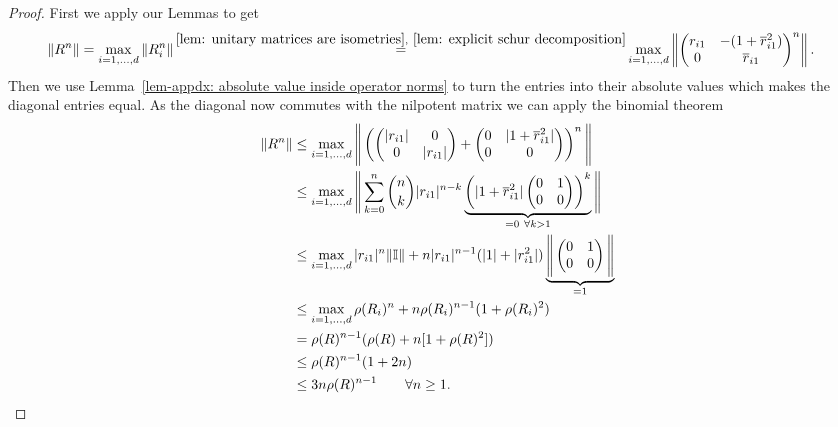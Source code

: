 \begin{proof}
	First we apply our Lemmas to get
	\begin{align*}
		\|R^n\|
		&=\max_{i=1,\dots,\dimension}	\|R_i^n\|
		\xeq{\ref{lem: unitary matrices are isometries},\ \ref{lem: explicit schur decomposition}}
		\max_{i=1,\dots,\dimension}\left\|\begin{pmatrix}
			r_{i1} & -(1+\conjugate{r}_{i1}^2)\\
			0 & \conjugate{r}_{i1}
		\end{pmatrix}^n\right\|.
	\end{align*}
	Then we use Lemma~\ref{lem-appdx: absolute value inside operator norms} to
	turn the entries into their absolute values which makes the diagonal entries
	equal. As the diagonal now commutes with the nilpotent matrix we can apply the
	binomial theorem 
	\begin{align*}
		\|R^n\|
		&\le \max_{i=1,\dots,d}
		\Bigg\|\left(
		\begin{pmatrix}
			|r_{i1}| & 0\\
			0 & |r_{i1}|
		\end{pmatrix}
		+ \begin{pmatrix}
			0 & |1+\overline{r}_{i1}^2|\\
			0 & 0
		\end{pmatrix}
		\right)^n\Bigg\|\\
		&\le \max_{i=1,\dots,d}
		\Bigg\|
		\sum_{k=0}^n \binom{n}{k}
				|r_{i1}|^{n-k}
			\underbrace{
				\left(
				|1+\overline{r}_{i1}^2|
				\begin{pmatrix}
					0 & 1\\
					0 & 0
				\end{pmatrix}
				\right)^k
			}_{=0 \ \forall k>1}
		\Bigg\|\\
		&\le \max_{i=1,\dots,d}
		|r_{i1}|^n \|\mathbb{I}\| + n |r_{i1}|^{n-1}(|1|+|r_{i1}^2|)
		\underbrace{
			\Bigg\|
				\begin{pmatrix}
					0 & 1\\
					0 & 0
				\end{pmatrix}
			\Bigg\|
		}_{=1}
		\\
		&\le \max_{i=1,\dots,d}
		\rho(R_i)^n + n \rho(R_i)^{n-1}(1+\rho(R_i)^2)\\
		&=	\rho(R)^{n-1}(\rho(R) + n [1+\rho(R)^2])\\
		&\le \rho(R)^{n-1}(1 + 2n)\\
		&\le 3n\rho(R)^{n-1} \qquad \forall n\ge 1.
	\end{align*}

\end{proof}

